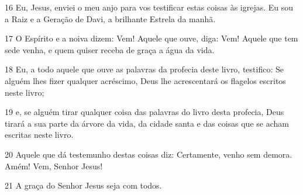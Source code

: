 \par 16 Eu, Jesus, enviei o meu anjo para vos testificar estas coisas às igrejas. Eu sou a Raiz e a Geração de Davi, a brilhante Estrela da manhã.
\par 17 O Espírito e a noiva dizem: Vem! Aquele que ouve, diga: Vem! Aquele que tem sede venha, e quem quiser receba de graça a água da vida.
\par 18 Eu, a todo aquele que ouve as palavras da profecia deste livro, testifico: Se alguém lhes fizer qualquer acréscimo, Deus lhe acrescentará os flagelos escritos neste livro;
\par 19 e, se alguém tirar qualquer coisa das palavras do livro desta profecia, Deus tirará a sua parte da árvore da vida, da cidade santa e das coisas que se acham escritas neste livro.
\par 20 Aquele que dá testemunho destas coisas diz: Certamente, venho sem demora. Amém! Vem, Senhor Jesus!
\par 21 A graça do Senhor Jesus seja com todos.


